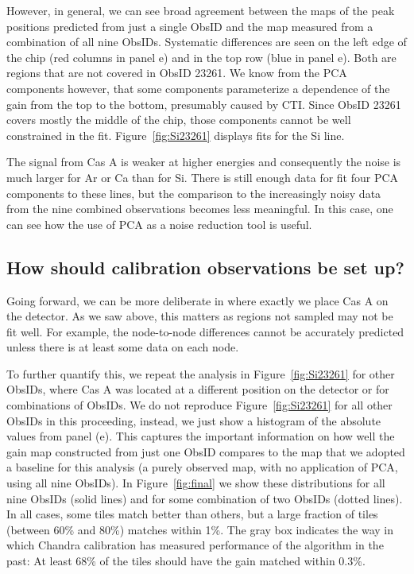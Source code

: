 \documentclass[]{spie}  %
\begin{document}
However, in general, we can see broad agreement between the maps of the peak positions predicted from just a single ObsID and the map measured from a combination of all nine ObsIDs. Systematic differences are seen on the left edge of the chip (red columns in panel e) and in the top row (blue in panel e). Both are regions that are not covered in ObsID 23261. We know from the PCA components however, that some components parameterize a dependence of the gain from the top to the bottom, presumably caused by CTI. Since ObsID 23261 covers mostly the middle of the chip, those components cannot be well constrained in the fit. Figure~\ref{fig:Si23261} displays fits for the Si line.

The signal from Cas A is weaker at higher energies and consequently the noise is much larger for Ar or Ca than for Si. There is still enough data for fit four PCA components to these lines, but the comparison to the increasingly noisy data from the nine combined observations becomes less meaningful. In this case, one can see how the use of PCA as a noise reduction tool is useful.

\subsection{How should calibration observations be set up?}
Going forward, we can be more deliberate in where exactly we place Cas A on the detector. As we saw above, this matters as regions not sampled may not be fit well. For example, the node-to-node differences cannot be accurately predicted unless there is at least some data on each node.

To further quantify this, we repeat the analysis in Figure~\ref{fig:Si23261} for other ObsIDs, where Cas A was located at a different position on the detector or for combinations of ObsIDs. We do not reproduce Figure~\ref{fig:Si23261} for all other ObsIDs in this proceeding, instead, we just show a histogram of the absolute values from panel (e). This captures the important information on how well the gain map constructed from just one ObsID compares to the map that we adopted a baseline for this analysis (a purely observed map, with no application of PCA, using all nine ObsIDs). In Figure~\ref{fig:final} we show these distributions for all nine ObsIDs (solid lines) and for some combination of two ObsIDs (dotted lines). In all cases, some tiles match better than others, but a large fraction of tiles (between 60\% and 80\%) matches within 1\%. The gray box indicates the way in which Chandra calibration has measured performance of the algorithm in the past: At least 68\% of the tiles should have the gain matched within 0.3\%.
\end{document}
